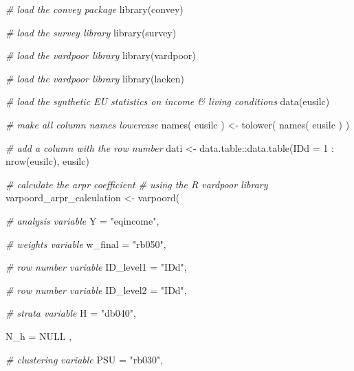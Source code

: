 \documentclass[
]{book}
\newenvironment{Shaded}{\begin{snugshade}}{\end{snugshade}}
\newcommand{\AttributeTok}[1]{\textcolor[rgb]{0.77,0.63,0.00}{#1}}
\newcommand{\CommentTok}[1]{\textcolor[rgb]{0.56,0.35,0.01}{\textit{#1}}}
\newcommand{\ConstantTok}[1]{\textcolor[rgb]{0.00,0.00,0.00}{#1}}
\newcommand{\DecValTok}[1]{\textcolor[rgb]{0.00,0.00,0.81}{#1}}
\newcommand{\FunctionTok}[1]{\textcolor[rgb]{0.00,0.00,0.00}{#1}}
\newcommand{\NormalTok}[1]{#1}
\newcommand{\OtherTok}[1]{\textcolor[rgb]{0.56,0.35,0.01}{#1}}
\newcommand{\SpecialCharTok}[1]{\textcolor[rgb]{0.00,0.00,0.00}{#1}}
\newcommand{\StringTok}[1]{\textcolor[rgb]{0.31,0.60,0.02}{#1}}
\begin{document}
\begin{Shaded}
\begin{Highlighting}[]
\CommentTok{\# load the convey package}
\FunctionTok{library}\NormalTok{(convey)}

\CommentTok{\# load the survey library}
\FunctionTok{library}\NormalTok{(survey)}

\CommentTok{\# load the vardpoor library}
\FunctionTok{library}\NormalTok{(vardpoor)}

\CommentTok{\# load the vardpoor library}
\FunctionTok{library}\NormalTok{(laeken)}

\CommentTok{\# load the synthetic EU statistics on income \& living conditions}
\FunctionTok{data}\NormalTok{(eusilc)}

\CommentTok{\# make all column names lowercase}
\FunctionTok{names}\NormalTok{( eusilc ) }\OtherTok{\textless{}{-}} \FunctionTok{tolower}\NormalTok{( }\FunctionTok{names}\NormalTok{( eusilc ) )}

\CommentTok{\# add a column with the row number}
\NormalTok{dati }\OtherTok{\textless{}{-}}\NormalTok{ data.table}\SpecialCharTok{::}\FunctionTok{data.table}\NormalTok{(}\AttributeTok{IDd =} \DecValTok{1} \SpecialCharTok{:} \FunctionTok{nrow}\NormalTok{(eusilc), eusilc)}

\CommentTok{\# calculate the arpr coefficient}
\CommentTok{\# using the R vardpoor library}
\NormalTok{varpoord\_arpr\_calculation }\OtherTok{\textless{}{-}}
    \FunctionTok{varpoord}\NormalTok{(}
    
        \CommentTok{\# analysis variable}
        \AttributeTok{Y =} \StringTok{"eqincome"}\NormalTok{, }
        
        \CommentTok{\# weights variable}
        \AttributeTok{w\_final =} \StringTok{"rb050"}\NormalTok{,}
        
        \CommentTok{\# row number variable}
        \AttributeTok{ID\_level1 =} \StringTok{"IDd"}\NormalTok{,}
        
        \CommentTok{\# row number variable}
        \AttributeTok{ID\_level2 =} \StringTok{"IDd"}\NormalTok{,}
        
        \CommentTok{\# strata variable}
        \AttributeTok{H =} \StringTok{"db040"}\NormalTok{, }
        
        \AttributeTok{N\_h =} \ConstantTok{NULL}\NormalTok{ ,}
        
        \CommentTok{\# clustering variable}
        \AttributeTok{PSU =} \StringTok{"rb030"}\NormalTok{, }
        

\end{Highlighting}
\end{Shaded}
\end{document}
